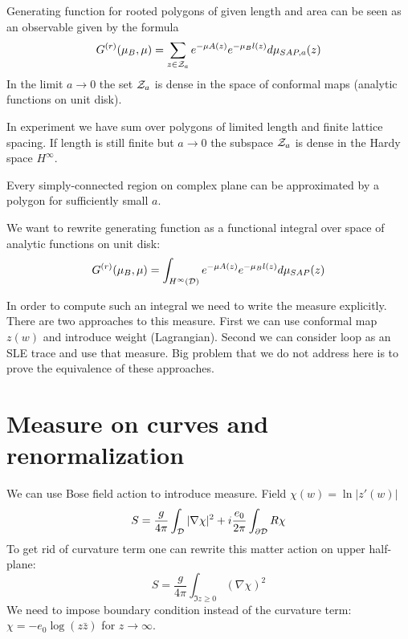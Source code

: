 \documentclass[12pt]{article}
\begin{document}
Generating function for rooted polygons of given length and area can be seen as an observable given by the formula
\begin{equation}
  \label{eq:1}
  G^{(r)}(\mu_{B},\mu)=\sum_{z\in{\cal Z}_{a}} e^{-\mu A(z)} e^{-\mu_{B} l(z)} d\mu_{SAP,a}(z)
\end{equation}
In the limit $a\to 0$ the set ${\cal Z}_{a}$ is dense in the space of conformal maps (analytic
functions on unit disk). 

In experiment we have sum over polygons of limited length and finite lattice spacing. If length is
still finite but $a\to 0$ the subspace ${\cal Z}_{a}$ is dense in the Hardy space $H^{\infty}$. 

Every simply-connected region on complex plane can be approximated by a polygon for sufficiently
small $a$.

We want to rewrite generating function as a functional integral over space of analytic functions on
unit disk:
\begin{equation}
  \label{eq:4}
   G^{(r)}(\mu_{B},\mu)=\int_{H^{\infty}({\cal D})} e^{-\mu A(z)} e^{-\mu_{B} l(z)} d\mu_{SAP}(z)
\end{equation}

In order to compute such an integral we need to write the measure explicitly. There are two
approaches to this measure. First we can use conformal map $z(w)$ and introduce weight (Lagrangian).
Second we can consider loop as an SLE trace and use that measure. Big problem that we do not address
here is to prove the equivalence of these approaches. 

\section{Measure on curves and renormalization}
\label{sec:meas-curv-renorm}

We can use Bose field action to introduce measure. Field $\chi(w)=\ln |z'(w)|$
\begin{equation}
  \label{eq:5}
  S=\frac{g}{4\pi} \int_{{\cal D}}|\nabla \chi|^{2} +i\frac{e_{0}}{2\pi} \int_{\partial {\cal D}}
  R\chi
\end{equation}
To get rid of curvature  term one can rewrite this matter action on upper half-plane:
\begin{equation}
  \label{eq:7}
  S=\frac{g}{4\pi} \int_{\Im z\geq 0}(\nabla \chi)^{2} 
\end{equation}
We need to impose boundary condition instead of the curvature term: $\chi=-e_{0}\log (z\bar z)$ for
$z\to \infty$.
\end{document}
